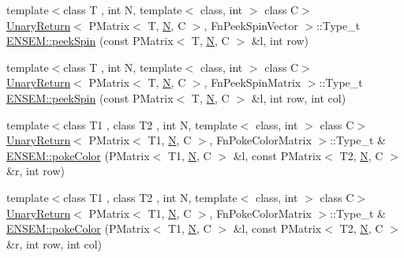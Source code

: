 \begin{DoxyCompactItemize}
\item 
{\footnotesize template$<$class T , int N, template$<$ class, int $>$ class C$>$ }\\\mbox{\hyperlink{structUnaryReturn}{Unary\+Return}}$<$ P\+Matrix$<$ T, \mbox{\hyperlink{adat__devel_2lib_2hadron_2operator__name__util_8cc_a7722c8ecbb62d99aee7ce68b1752f337}{N}}, C $>$, Fn\+Peek\+Spin\+Vector $>$\+::Type\+\_\+t \mbox{\hyperlink{group__primmatrix_gaf26619f85146d483d1c177abf5c2f476}{E\+N\+S\+E\+M\+::peek\+Spin}} (const P\+Matrix$<$ T, \mbox{\hyperlink{adat__devel_2lib_2hadron_2operator__name__util_8cc_a7722c8ecbb62d99aee7ce68b1752f337}{N}}, C $>$ \&l, int row)
\item 
{\footnotesize template$<$class T , int N, template$<$ class, int $>$ class C$>$ }\\\mbox{\hyperlink{structUnaryReturn}{Unary\+Return}}$<$ P\+Matrix$<$ T, \mbox{\hyperlink{adat__devel_2lib_2hadron_2operator__name__util_8cc_a7722c8ecbb62d99aee7ce68b1752f337}{N}}, C $>$, Fn\+Peek\+Spin\+Matrix $>$\+::Type\+\_\+t \mbox{\hyperlink{group__primmatrix_ga2efe19b2ef4dc4cbacc12117645bf8b8}{E\+N\+S\+E\+M\+::peek\+Spin}} (const P\+Matrix$<$ T, \mbox{\hyperlink{adat__devel_2lib_2hadron_2operator__name__util_8cc_a7722c8ecbb62d99aee7ce68b1752f337}{N}}, C $>$ \&l, int row, int col)
\item 
{\footnotesize template$<$class T1 , class T2 , int N, template$<$ class, int $>$ class C$>$ }\\\mbox{\hyperlink{structUnaryReturn}{Unary\+Return}}$<$ P\+Matrix$<$ T1, \mbox{\hyperlink{adat__devel_2lib_2hadron_2operator__name__util_8cc_a7722c8ecbb62d99aee7ce68b1752f337}{N}}, C $>$, Fn\+Poke\+Color\+Matrix $>$\+::Type\+\_\+t \& \mbox{\hyperlink{group__primmatrix_ga0cfeefefe2bd8b4e365ac10d8853664a}{E\+N\+S\+E\+M\+::poke\+Color}} (P\+Matrix$<$ T1, \mbox{\hyperlink{adat__devel_2lib_2hadron_2operator__name__util_8cc_a7722c8ecbb62d99aee7ce68b1752f337}{N}}, C $>$ \&l, const P\+Matrix$<$ T2, \mbox{\hyperlink{adat__devel_2lib_2hadron_2operator__name__util_8cc_a7722c8ecbb62d99aee7ce68b1752f337}{N}}, C $>$ \&r, int row)
\item 
{\footnotesize template$<$class T1 , class T2 , int N, template$<$ class, int $>$ class C$>$ }\\\mbox{\hyperlink{structUnaryReturn}{Unary\+Return}}$<$ P\+Matrix$<$ T1, \mbox{\hyperlink{adat__devel_2lib_2hadron_2operator__name__util_8cc_a7722c8ecbb62d99aee7ce68b1752f337}{N}}, C $>$, Fn\+Poke\+Color\+Matrix $>$\+::Type\+\_\+t \& \mbox{\hyperlink{group__primmatrix_gab840db69dc60bcb095f46b69353d09f3}{E\+N\+S\+E\+M\+::poke\+Color}} (P\+Matrix$<$ T1, \mbox{\hyperlink{adat__devel_2lib_2hadron_2operator__name__util_8cc_a7722c8ecbb62d99aee7ce68b1752f337}{N}}, C $>$ \&l, const P\+Matrix$<$ T2, \mbox{\hyperlink{adat__devel_2lib_2hadron_2operator__name__util_8cc_a7722c8ecbb62d99aee7ce68b1752f337}{N}}, C $>$ \&r, int row, int col)

\end{DoxyCompactItemize}

